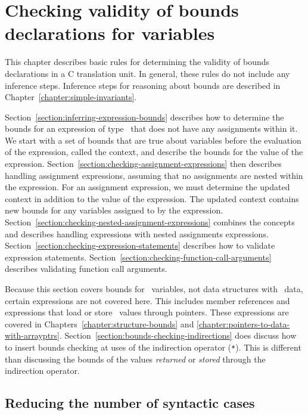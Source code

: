 
\chapter{Checking validity of bounds declarations for variables}
\label{chapter:checking-bounds}

This chapter describes basic rules for determining the validity of
bounds declarations in a C translation unit. In general, these rules do
not include any inference steps. Inference steps for reasoning about
bounds are described in Chapter~\ref{chapter:simple-invariants}.

Section~\ref{section:inferring-expression-bounds}
describes how to determine the bounds for an expression of
type \arrayptr\ that does not have any assignments within it.
We start with a set of bounds that are true about variables before the
evaluation of the expression, called the context, and describe the
bounds for the value of the expression.
Section~\ref{section:checking-assignment-expressions}
then describes handling assignment expressions, assuming
that no assignments are nested within the expression. For an assignment
expression, we must determine the updated context in addition to the
value of the expression. The updated context contains new bounds for any
variables assigned to by the expression.
Section~\ref{section:checking-nested-assignment-expressions}
combines the concepts and describes handling expressions
with nested assignments expressions.
Section~\ref{section:checking-expression-statements} 
describes how to validate expression statements. 
Section~\ref{section:checking-function-call-arguments}
describes validating function call arguments.

Because this section covers bounds for \arrayptr\ variables,
not data structures with \arrayptr\ data, certain expressions
are not covered here. This includes member references and expressions
that load or store \arrayptr\ values through pointers. These
expressions are covered in Chapters~\ref{chapter:structure-bounds} and
\ref{chapter:pointers-to-data-with-arrayptrs}.
Section~\ref{section:bounds-checking-indirections} does discuss how to 
insert bounds checking at uses of the
indirection operator (\texttt{*}). This is different than discussing the
bounds of the values \emph{returned} or \emph{stored} through the
indirection operator.

\section{Reducing the number of syntactic cases}

